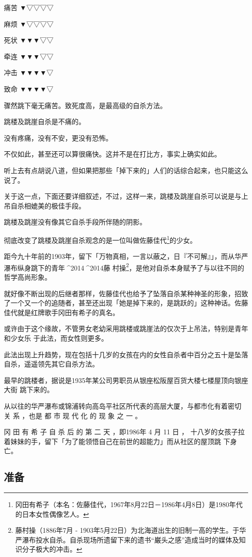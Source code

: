 \documentclass[UTF8]{ctexart}
\begin{document}
痛苦 ▼▽▽▽▽

麻烦 ▼▽▽▽▽

死状 ▼▼▼▽▽

牵连 ▼▼▼▽▽

冲击 ▼▼▼▼▽

致命 ▼▼▼▼▽

骤然跳下毫无痛苦。致死度高，是最高级的自杀方法。

跳楼及跳崖自杀是不痛的。

没有疼痛，没有不安，更没有恐怖。

不仅如此，甚至还可以算很痛快。这并不是在打比方，事实上确实如此。

听上去有点胡说八道，但如果把那些「掉下来的」人们的话综合起来，也只能这么说了。

关于这一点，下面还要详细叙述，不过，这样一来，跳楼及跳崖自杀可以说是与上吊自杀相媲美的极佳手段。

跳楼及跳崖没有像其它自杀手段所伴随的阴影。

彻底改变了跳楼及跳崖自杀观念的是一位叫做佐藤佳代\footnote{冈田有希子（本名：佐藤佳代，1967年8月22日－1986年4月8日）是1980年代的日本女性偶像艺人。}的少女。

距今九十年前的1903年，留下「万物真相，一言以蔽之，日『不可解』」，而从华严瀑布纵身跳下的青年^^^^2014^^^^2014藤
村操\footnote{藤村操（1886年7月 - 1903年5月22日）为北海道出生的旧制一高的学生。于华严瀑布投水自杀。自杀现场所遗留下来的遗书“巌头之感”造成当时的媒体及知识分子极大的冲击。}，是他对自杀本身赋予了与以往不同的哲学高尚形象。

就好像不断出现的后继者那样，佐藤佳代也给予了坠落自杀某种神圣的形象，招致了一个又一个的追随者，甚至还出现「她是掉下来的，是跳跃的」这种神话。佐藤佳代就是红牌歌手冈田有希子的真名。

或许由于这个缘故，不管男女老幼采用跳楼或跳崖法的仅次于上吊法，特别是青年和少女乐 于此法，而女性则更多。

此法出现上升趋势，现在包括十几岁的女孩在内的女性自杀者中百分之五十是坠落自杀，遥遥领先其它自杀方法。

最早的跳楼者，据说是1935年某公司男职员从银座松阪屋百货大楼七楼屋顶向银座大街 跳下来的。

从以往的华严瀑布或锦浦转向高岛平社区所代表的高层大厦，与都市化有着密切 关 系 ，也是 都 市 现 代 化 的 现 象 之 一 。

冈 田 有 希 子 自 杀 后 的 第 二 天 ，即1986年 4 月 11 日 ， 十八岁的女孩子拉着妹妹的手，留下「为了能领悟自己在前世的超能力」而从社区的屋顶跳 下身亡。 

\subsection{准备}
\end{document}
